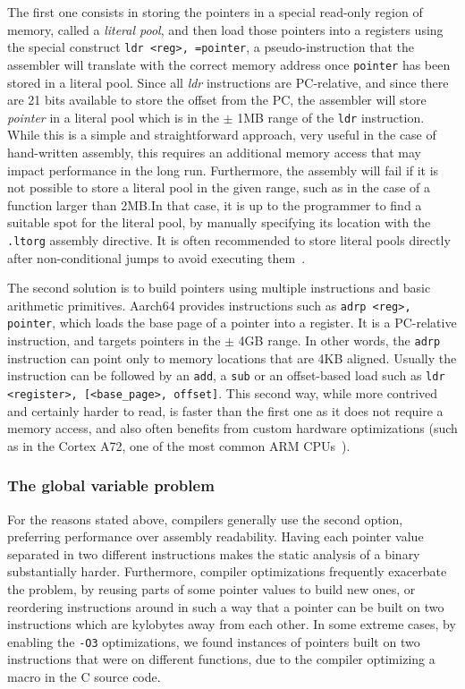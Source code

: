 \documentclass[a4paper,11pt,oneside]{report}
\begin{document}
The first one consists in storing the pointers in a special read-only region of 
memory, called a \emph{literal pool}, and then load those pointers into a 
registers using the special construct \texttt{ldr <reg>, =pointer}, a 
pseudo-instruction that the assembler will translate with the correct memory 
address once \texttt{pointer} has been stored in a literal pool.  Since all 
\emph{ldr} instructions are PC-relative, and since there are 21 bits available 
to store the offset from the PC, the assembler will store \emph{pointer} in a 
literal pool which is in the $\pm$ 1MB range of the \texttt{ldr} instruction.  
While this is a simple and straightforward approach, very useful in the case of 
hand-written assembly, this requires an additional memory access that may 
impact performance in the long run. Furthermore, the assembly will fail if it 
is not possible to store a literal pool in the given range, such as in the case 
of a function larger than 2MB.\@ In that case, it is up to the programmer to 
find a suitable spot for the literal pool, by manually specifying its location 
with the \texttt{.ltorg} assembly directive. It is often recommended to store 
literal pools directly after non-conditional jumps to avoid executing 
them~\cite{literalpools}.

The second solution is to build pointers using multiple instructions and basic 
arithmetic primitives. Aarch64 provides instructions such as \texttt{adrp 
<reg>, pointer}, which loads the base page of a pointer into a register. It is 
a PC-relative instruction, and targets pointers in the $\pm$ 4GB range.  In 
other words, the \texttt{adrp} instruction can point only to memory locations 
that are 4KB aligned. Usually the instruction can be followed by an 
\texttt{add}, a \texttt{sub} or an offset-based load such as \texttt{ldr 
<register>, [<base\_page>, offset]}. This second way, while more contrived and 
certainly harder to read, is faster than the first one as it does not require a 
memory access, and also often benefits from custom hardware optimizations (such 
as in the Cortex A72, one of the most common ARM 
CPUs~\cite{pointeroptimizations}). 

\subsubsection{The global variable problem}
For the reasons stated above, compilers generally use the second option, 
preferring performance over assembly readability. Having each pointer value 
separated in two different instructions makes the static analysis of a binary 
substantially harder. Furthermore, compiler optimizations frequently exacerbate 
the problem, by reusing parts of some pointer values to build new ones, or 
reordering instructions around in such a way that a pointer can be built on two 
instructions which are kylobytes away from each other. In some extreme cases, 
by enabling the \texttt{-O3} optimizations, we found instances of pointers 
built on two instructions that were on different functions, due to the compiler 
optimizing a macro in the C source code. 
\end{document}

